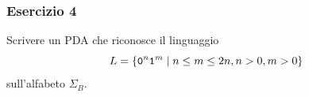 \begin{frame}
        \frametitle{Esercizio 4}
        Scrivere un PDA che riconosce il linguaggio
        \[
                L = \{ \mathtt{0}^{n} \mathtt{1}^{m} \; \vert \; n \le m \le 2n, n>0, m>0 \}
        \]
        sull'alfabeto $\Sigma_{B}$.

        \bigskip

\end{frame}





